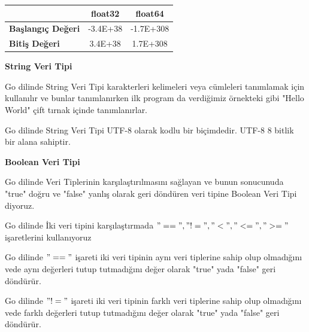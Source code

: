 \begin{table}[!htb]
\begin{tabular}{|lcccc|}
\multicolumn{1}{|l|}{}                          & \multicolumn{2}{c|}{\textbf{float32}}                                      & \multicolumn{2}{c|}{\textbf{float64}}                                            \\ \hline
\multicolumn{1}{|l|}{\textbf{Başlangıç Değeri}} & \multicolumn{2}{c|}{-3.4E+38}                                              & \multicolumn{2}{c|}{-1.7E+308}                                                   \\ \hline
\multicolumn{1}{|l|}{\textbf{Bitiş Değeri}}     & \multicolumn{2}{c|}{3.4E+38}                                               & \multicolumn{2}{c|}{1.7E+308}                                                    \\ \hline
\end{tabular}
\end{table}


\vspace{20mm}
\textbf{String Veri Tipi}
\vspace{7mm}

Go dilinde String Veri Tipi karakterleri kelimeleri veya cümleleri tanımlamak için kullanılır ve bunlar tanımlanırken ilk program da verdiğimiz örnekteki gibi "Hello World" çift tırnak içinde tanımlanırlar.

\vspace{5mm}
Go dilinde String Veri Tipi UTF-8 olarak kodlu bir biçimdedir. UTF-8 8 bitlik bir alana sahiptir.


\vspace{20mm}
\textbf{Boolean Veri Tipi}
\vspace{7mm}

Go dilinde Veri Tiplerinin karşılaştırılmasını sağlayan ve bunun sonucunuda "true" doğru ve "false" yanlış olarak geri döndüren veri tipine Boolean Veri Tipi diyoruz.

\vspace{10mm}
Go dilinde İki veri tipini karşılaştırmada $"==", "!=", "<", "<=", ">="$ işaretlerini kullanıyoruz

\vspace{10mm}
Go dilinde $"=="$ işareti iki veri tipinin aynı veri tiplerine sahip olup olmadığını vede aynı değerleri tutup tutmadığını değer olarak "true" yada "false" geri döndürür.

\vspace{10mm}
Go dilinde $"!="$ işareti iki veri tipinin farklı veri tiplerine sahip olup olmadığını vede farklı değerleri tutup tutmadığını değer olarak "true" yada "false" geri döndürür.

